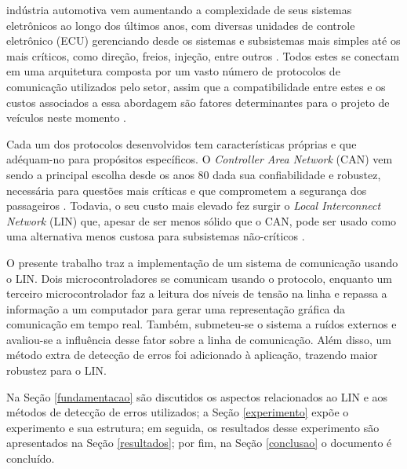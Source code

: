 

 indústria automotiva vem aumentando a complexidade de seus sistemas eletrônicos ao longo dos últimos anos, com diversas unidades de controle eletrônico (ECU) gerenciando desde os sistemas e subsistemas mais simples até os mais críticos, como direção, freios, injeção, entre outros \cite{studnia:2013}. Todos estes se conectam em uma arquitetura composta por um vasto número de protocolos de comunicação utilizados pelo setor, assim que a compatibilidade entre estes e os custos associados a essa abordagem são fatores determinantes para o projeto de veículos neste momento \cite{gabriel:2003}.

Cada um dos protocolos desenvolvidos tem características próprias e que adéquam-no para propósitos específicos. O \textit{Controller Area Network} (CAN) vem sendo a principal escolha desde os anos 80 dada sua confiabilidade e robustez, necessária para questões mais críticas e que comprometem a segurança dos passageiros \cite{ernst:2018}. Todavia, o seu custo mais elevado fez surgir o \textit{Local Interconnect Network} (LIN) que, apesar de ser menos sólido que o CAN, pode ser usado como uma alternativa menos custosa para subsistemas não-críticos \cite{xu2006application}.

O presente trabalho traz a implementação de um sistema de comunicação usando o LIN. Dois microcontroladores se comunicam usando o protocolo, enquanto um terceiro microcontrolador faz a leitura dos níveis de tensão na linha e repassa a informação a um computador para gerar uma representação gráfica da comunicação em tempo real. Também, submeteu-se o sistema a ruídos externos e avaliou-se a influência desse fator sobre a linha de comunicação. Além disso, um método extra de detecção de erros foi adicionado à aplicação, trazendo maior robustez para o LIN.

Na Seção \ref{fundamentacao} são discutidos os aspectos relacionados ao LIN e aos métodos de detecção de erros utilizados; a Seção \ref{experimento} expõe o experimento e sua estrutura; em seguida, os resultados desse experimento são apresentados na Seção \ref{resultados}; por fim, na Seção \ref{conclusao} o documento é concluído.

